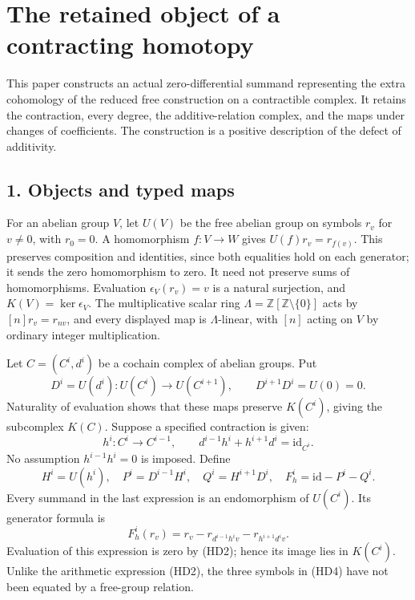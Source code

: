 \documentclass[
]{article}
\author{}
\date{}
\begin{document}
{
\setcounter{tocdepth}{3}
\tableofcontents
}
\section{The retained object of a contracting
homotopy}\label{the-retained-object-of-a-contracting-homotopy}

This paper constructs an actual zero-differential summand representing
the extra cohomology of the reduced free construction on a contractible
complex. It retains the contraction, every degree, the additive-relation
complex, and the maps under changes of coefficients. The construction is
a positive description of the defect of additivity.

\subsection{1. Objects and typed maps}\label{objects-and-typed-maps}

For an abelian group \(V\), let \(U(V)\) be the free abelian group on
symbols \(r_v\) for \(v\ne0\), with \(r_0=0\). A homomorphism
\(f:V\to W\) gives \(U(f)r_v=r_{f(v)}\). This preserves composition and
identities, since both equalities hold on each generator; it sends the
zero homomorphism to zero. It need not preserve sums of homomorphisms.
Evaluation \(\epsilon_V(r_v)=v\) is a natural surjection, and
\(K(V)=\ker\epsilon_V\). The multiplicative scalar ring
\(\Lambda=\mathbb Z[\mathbb Z\setminus\{0\}]\) acts by
\([n]r_v=r_{nv}\), and every displayed map is \(\Lambda\)-linear, with
\([n]\) acting on \(V\) by ordinary integer multiplication.

Let \(C=(C^i,d^i)\) be a cochain complex of abelian groups. Put \[
D^i=U(d^i):U(C^i)\to U(C^{i+1}),\qquad
D^{i+1}D^i=U(0)=0.
\tag{HD1}
\] Naturality of evaluation shows that these maps preserve \(K(C^i)\),
giving the subcomplex \(K(C)\). Suppose a specified contraction is
given: \[
h^i:C^i\to C^{i-1},\qquad
d^{i-1}h^i+h^{i+1}d^i=\mathrm{id}_{C^i}.
\tag{HD2}
\] No assumption \(h^{i-1}h^i=0\) is imposed. Define \[
H^i=U(h^i),\quad
P^i=D^{i-1}H^i,\quad Q^i=H^{i+1}D^i,\quad
F_h^i=\mathrm{id}-P^i-Q^i.
\tag{HD3}
\] Every summand in the last expression is an endomorphism of
\(U(C^i)\). Its generator formula is \[
F_h^i(r_v)=r_v-r_{d^{i-1}h^iv}-r_{h^{i+1}d^iv}.
\tag{HD4}
\] Evaluation of this expression is zero by (HD2); hence its image lies
in \(K(C^i)\). Unlike the arithmetic expression (HD2), the three symbols
in (HD4) have not been equated by a free-group relation.
\end{document}

